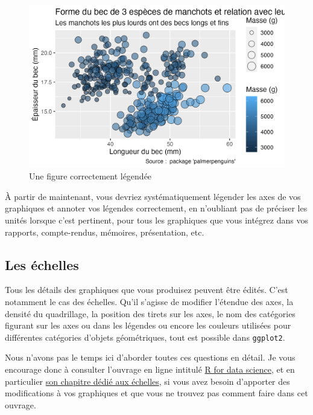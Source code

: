 \documentclass[
  letterpaper,
  DIV=11,
  numbers=noendperiod]{scrreprt}
\begin{document}
\begin{figure}[H]

{\centering \includegraphics{./03-visualization_files/figure-pdf/fig-label-1.png}

}

\caption{\label{fig-label}Une figure correctement légendée}

\end{figure}

À partir de maintenant, vous devriez systématiquement légender les axes
de vos graphiques et annoter vos légendes correctement, en n'oubliant
pas de préciser les unités lorsque c'est pertinent, pour tous les
graphiques que vous intégrez dans vos rapports, compte-rendus, mémoires,
présentation, etc.

\hypertarget{les-uxe9chelles}{%
\subsection{Les échelles}\label{les-uxe9chelles}}

Tous les détails des graphiques que vous produisez peuvent être édités.
C'est notamment le cas des échelles. Qu'il s'agisse de modifier
l'étendue des axes, la densité du quadrillage, la position des tirets
sur les axes, le nom des catégories figurant sur les axes ou dans les
légendes ou encore les couleurs utilisées pour différentes catégories
d'objets géométriques, tout est possible dans \texttt{ggplot2}.

Nous n'avons pas le temps ici d'aborder toutes ces questions en détail.
Je vous encourage donc à consulter l'ouvrage en ligne intitulé
\href{http://r4ds.had.co.nz/}{R for data science}, et en particulier
\href{http://r4ds.had.co.nz/graphics-for-communication.html\#scales}{son
chapitre dédié aux échelles}, si vous avez besoin d'apporter des
modifications à vos graphiques et que vous ne trouvez pas comment faire
dans cet ouvrage.
\end{document}
